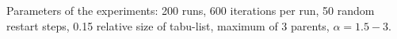 \documentclass[english,cover]{fitthesis} %
\newcommand{\ignore}[1]{}                  %
\newcommand{\todo}[1]{{\color{red}#1}}
\begin{document}
\medskip
Parameters of the experiments: 200 runs, 600 iterations per run, 50 random restart steps, 0.15 relative size of tabu-list, maximum of 3 parents, $\alpha=1.5-3$.



\ignore{
\todo{xxx}


Parameters of the experiments: 300 runs, 1\,000 iterations per run, 50 random restart steps, 0.15 relative size of tabu-list, maximum of 6 parents, $\alpha=0.1-5$.
}
\end{document}
